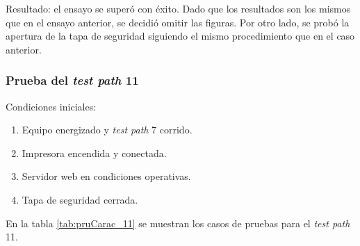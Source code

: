 Resultado: el ensayo se superó con éxito. Dado que los resultados son los mismos que en el ensayo anterior, se decidió omitir las figuras. Por otro lado, se probó la apertura de la tapa de seguridad siguiendo el mismo procedimiento que en el caso anterior.

\subsubsection{Prueba del \textit{test path} 11}
\label{subsubsec:pruCarac_11}

Condiciones iniciales: 

\begin{enumerate}
	\item Equipo energizado y \textit{test path} 7 corrido.
	\item Impresora encendida y conectada.
	\item Servidor web en condiciones operativas.
	\item Tapa de seguridad cerrada.
\end{enumerate}

En la tabla \ref{tab:pruCarac_11} se muestran los casos de pruebas para el \textit{test path} 11.

